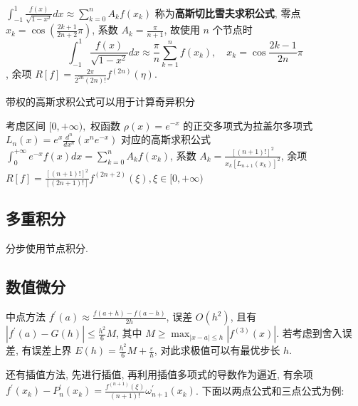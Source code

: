 \documentclass[10pt]{yerbaformat}
\begin{document}
\begin{definition}
    $\int_{-1}^{1} \frac{f(x)}{\sqrt{1-x^{2}}} d x \approx \sum_{k=0}^{n} A_{k} f\left(x_{k}\right)$ 称为\textbf{高斯切比雪夫求积公式}, 零点 $x_{k}=\cos \left(\frac{2 k+1}{2 n+2} \pi\right)$, 系数 $A_{k}=\frac{\pi}{n+1}$, 故使用 $n$ 个节点时 $$\int_{-1}^{1} \frac{f(x)}{\sqrt{1-x^{2}}} d x \approx \frac{\pi}{n} \sum_{k=1}^{n} f\left(x_{k}\right), \quad x_{k}=\cos \frac{2 k-1}{2 n} \pi$$, 余项 $R[f]=\frac{2 \pi}{2^{2 n}(2 n) !} f^{(2 n)}(\eta)$.
\end{definition}

\par 带权的高斯求积公式可以用于计算奇异积分

\begin{definition}
    考虑区间 $[0,+\infty),$ 权函数 $\rho(x)=e^{-x}$ 的正交多项式为拉盖尔多项式 $L_{n}(x)=e^{x} \frac{d^{n}}{d x^{n}}\left(x^{n} e^{-x}\right)$ 对应的高斯求积公式 $\int_{0}^{+\infty} e^{-x} f(x) d x=\sum_{k=0}^{n} A_{k} f\left(x_{k}\right)$, 系数 $A_{k}=\frac{[(n+1) !]^{2}}{x_{k}\left[L_{n+1}\left(x_{k}\right)\right]^{2}}$, 余项 $R[f]=\frac{[(n+1) !]^{2}}{[(2 n+1) !]} f^{(2 n+2)}(\xi), \xi \in[0,+\infty)$
\end{definition}

\subsection{多重积分}

\par 分步使用节点积分.

\subsection{数值微分}

\par 中点方法 $f^{\prime}(a) \approx \frac{f(a+h)-f(a-h)}{2 h}$, 误差 $O\left(h^{2}\right)$, 且有 $\left|f^{\prime}(a)-G(h)\right| \leq \frac{h^{2}}{6} M$, 其中 $M \geq \max _{|x-a| \leq h}\left|f^{(3)}(x)\right|$. 若考虑到舍入误差, 有误差上界 $E(h)=\frac{h^{2}}{6} M+\frac{\varepsilon}{h}$, 对此求极值可以有最优步长 $h$.

\par 还有插值方法, 先进行插值, 再利用插值多项式的导数作为逼近, 有余项 $f^{\prime}\left(x_{k}\right)-P_{n}^{\prime}\left(x_{k}\right)=\frac{f^{(n+1)}(\xi)}{(n+1) !} \omega_{n+1}^{\prime}\left(x_{k}\right)$. 下面以两点公式和三点公式为例:
\end{document}
